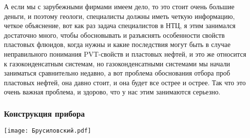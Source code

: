 \documentclass[main.tex]{subfiles}
\begin{document}
А если мы с зарубежными фирмами имеем дело, то это стоит очень большие деньги, и поэтому геологи, специалисты должны иметь четкую информацию, четкое объяснение, вот как раз задача специалистов в НТЦ, я этим занимался достаточно много, чтобы обосновывать и разъяснять особенности свойств пластовых флюидов, когда нужны и какие последствия могут быть в случае неправильного понимания PVT-свойств и пластовых нефтей, и это же относится к газоконденсатным системам, но газоконденсатными системами мы начали заниматься сравнительно недавно, а вот проблема обоснования отбора проб пластовых нефтей, она давно стоит, и она будет все острее и острее.
Так что это очень важная проблема, и здорово, что у нас этим занимаются серьезно.

\subsubsection{Конструкция прибора}

\begin{center}
\texttt{[image: Брусиловский.pdf]}
\end{center}
\end{document}
